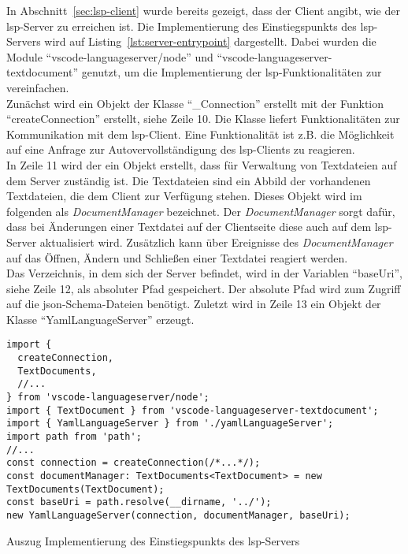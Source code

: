 In Abschnitt~\ref{sec:lsp-client} wurde bereits gezeigt, dass der Client angibt, wie der \ac{lsp}-Server zu erreichen ist.
Die Implementierung des Einstiegspunkts des \ac{lsp}-Servers wird auf Listing~\ref{lst:server-entrypoint} dargestellt.
Dabei wurden die Module ``vscode-languageserver/node'' und ``vscode-languageserver-textdocument'' genutzt, um die
Implementierung der \ac{lsp}-Funktionalitäten zur vereinfachen.
\\
Zunächst wird ein Objekt der Klasse ``\_Connection'' erstellt mit der Funktion ``createConnection'' erstellt, siehe Zeile 10.
Die Klasse liefert Funktionalitäten zur Kommunikation mit dem \ac{lsp}-Client.
Eine Funktionalität ist z.B. die Möglichkeit auf eine Anfrage zur Autovervollständigung des \ac{lsp}-Clients zu reagieren.
\\
In Zeile 11 wird der ein Objekt erstellt, dass für Verwaltung von Textdateien auf dem Server zuständig ist.
Die Textdateien sind ein Abbild der vorhandenen Textdateien, die dem Client zur Verfügung stehen.
Dieses Objekt wird im folgenden als \textit{DocumentManager} bezeichnet.
Der \textit{DocumentManager} sorgt dafür, dass bei Änderungen einer Textdatei auf der Clientseite diese auch auf dem \ac{lsp}-Server aktualisiert wird.
Zusätzlich kann über Ereignisse des \textit{DocumentManager} auf das Öffnen, Ändern und Schließen einer Textdatei reagiert werden.
\\
Das Verzeichnis, in dem sich der Server befindet, wird in der Variablen ``baseUri'', siehe Zeile 12, als absoluter Pfad gespeichert.
Der absolute Pfad wird zum Zugriff auf die \ac{json}-Schema-Dateien benötigt.
Zuletzt wird in Zeile 13 ein Objekt der Klasse ``YamlLanguageServer'' erzeugt.

\begin{listing}[htp]
  \begin{verbatim}
import { 
  createConnection, 
  TextDocuments, 
  //...
} from 'vscode-languageserver/node';
import { TextDocument } from 'vscode-languageserver-textdocument';
import { YamlLanguageServer } from './yamlLanguageServer';
import path from 'path';
//...
const connection = createConnection(/*...*/);
const documentManager: TextDocuments<TextDocument> = new TextDocuments(TextDocument);
const baseUri = path.resolve(__dirname, '../');
new YamlLanguageServer(connection, documentManager, baseUri);
      \end{verbatim}
  \caption{Auszug Implementierung des Einstiegspunkts des \acs{lsp}-Servers}
  \label{lst:server-entrypoint}
\end{listing}


